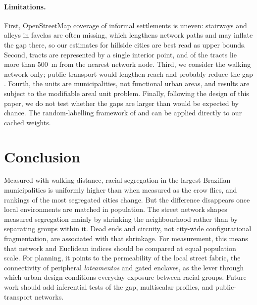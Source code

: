 \paragraph{Limitations.} First, OpenStreetMap coverage of informal settlements is uneven: stairways and alleys
in favelas are often missing, which lengthens network paths and may inflate the gap there, so our estimates for
hillside cities are best read as upper bounds. Second, tracts are represented by a single interior point, and
\nSnapFar{} of the \nTractsUrban{} tracts lie more than 500~m from the nearest network node. Third, we consider the
walking network only; public transport would lengthen reach and probably reduce the gap
\citep{pereira2021r5r,bittencourt2021cumulative}. Fourth, the units are municipalities, not functional urban
areas, and results are subject to the modifiable areal unit problem. Finally, following the design of this paper,
we do not test whether the gaps are larger than would be expected by chance. The random-labelling framework of
\citet{rey2021comparative} and \citet{knaap2024segregated} can be applied directly to our cached weights.

\section{Conclusion}\label{sec:conclusion}

Measured with walking distance, racial segregation in the \nCities{} largest Brazilian municipalities is
uniformly higher than when measured as the crow flies, and rankings of the most segregated cities change. But
the difference disappears once local environments are matched in population. The street network shapes measured
segregation mainly by shrinking the neighbourhood rather than by separating groups within it. Dead ends and
circuity, not city-wide configurational fragmentation, are associated with that shrinkage. For measurement, this
means that network and Euclidean indices should be compared at equal population scale. For planning, it points to
the permeability of the local street fabric, the connectivity of peripheral \emph{loteamentos} and gated enclaves,
as the lever through which urban design conditions everyday exposure between racial groups. Future work should
add inferential tests of the gap, multiscalar profiles, and public-transport networks.
